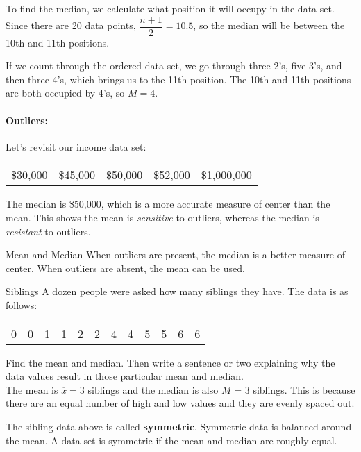 To find the median, we calculate what position it will occupy in the data set.  Since there are 20 data points, $\dfrac{n+1}{2}=10.5$, so the median will be between the 10th and 11th positions.

If we count through the ordered data set, we go through three 2's, five 3's, and then three 4's, which brings us to the 11th position.  The 10th and 11th positions are both occupied by 4's, so $M=4$.

\paragraph{Outliers:} Let's revisit our income data set:
\begin{center}
\begin{tabular}{c c c c c}
\$30,000 & \$45,000 & \$50,000 & \$52,000 & \$1,000,000
\end{tabular}
\end{center}

The median is \$50,000, which is a more accurate measure of center than the mean. This shows the mean is \textit{sensitive} to outliers, whereas the median is \textit{resistant} to outliers. 

\begin{proc}{Mean and Median}
When outliers are present, the median is a better measure of center. When outliers are absent, the mean can be used.
\end{proc}
\pagebreak

\begin{example}[https://www.youtube.com/watch?v=9H2H_DixDQs]{Siblings} 
A dozen people were asked how many siblings they have. The data is as follows: 
\begin{center}
\begin{tabular}{c c c c c c c c c c c c}
0 & 0 & 1 & 1 & 2 & 2 & 4 & 4 & 5 & 5 & 6 & 6
\end{tabular}
\end{center}
Find the mean and median. Then write a sentence or two explaining why the data values result in those particular mean and median.\\

The mean is $\overline{x} = 3$ siblings and the median is also $M$ = 3 siblings. This is because there are an equal number of high and low values and they are evenly spaced out.
\end{example}

The sibling data above is called \textbf{symmetric}. Symmetric data is balanced around the mean. A data set is symmetric if the mean and median are roughly equal.


